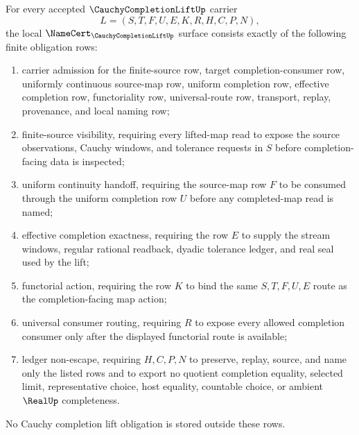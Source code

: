 \begin{theorem}
\label{thm:cauchy-completion-lift-namecert-obligations}
For every accepted $\CauchyCompletionLiftUp$ carrier
$$
L=(S,T,F,U,E,K,R,H,C,P,N),
$$
the local $\NameCert_{\CauchyCompletionLiftUp}$ surface consists exactly of the following finite obligation rows:
\begin{enumerate}
\item carrier admission for the finite-source row, target completion-consumer row, uniformly continuous source-map row, uniform completion row, effective completion row, functoriality row, universal-route row, transport, replay, provenance, and local naming row;
\item finite-source visibility, requiring every lifted-map read to expose the source observations, Cauchy windows, and tolerance requests in $S$ before completion-facing data is inspected;
\item uniform continuity handoff, requiring the source-map row $F$ to be consumed through the uniform completion row $U$ before any completed-map read is named;
\item effective completion exactness, requiring the row $E$ to supply the stream windows, regular rational readback, dyadic tolerance ledger, and real seal used by the lift;
\item functorial action, requiring the row $K$ to bind the same $S,T,F,U,E$ route as the completion-facing map action;
\item universal consumer routing, requiring $R$ to expose every allowed completion consumer only after the displayed functorial route is available;
\item ledger non-escape, requiring $H,C,P,N$ to preserve, replay, source, and name only the listed rows and to export no quotient completion equality, selected limit, representative choice, host equality, countable choice, or ambient $\RealUp$ completeness.
\end{enumerate}
No Cauchy completion lift obligation is stored outside these rows.
\end{theorem}
